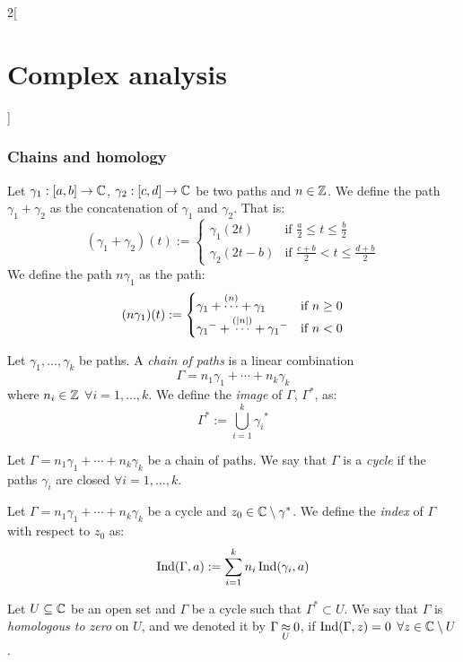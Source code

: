\documentclass[../../../main_math.tex]{subfiles}
\begin{document}
\begin{multicols}{2}[\section{Complex analysis}]
  \subsubsection{Chains and homology}
  \begin{definition}
    Let $\gamma_1:[a,b]\rightarrow\mathbb{C}$, $\gamma_2:[c,d]\rightarrow\mathbb{C}$ be two paths and $n\in\mathbb{Z}$. We define the path $\gamma_1+\gamma_2$ as the concatenation of $\gamma_1$ and $\gamma_2$. That is:
    $$
      (\gamma_1+\gamma_2)(t):=
      \begin{cases}
        \gamma_1(2t)   & \text{if }\frac{a}{2}\leq t\leq \frac{b}{2}  \\
        \gamma_2(2t-b) & \text{if }\frac{c+b}{2} <t\leq \frac{d+b}{2}
      \end{cases}
    $$
    We define the path $n\gamma_1$ as the path:
    $$
      (n\gamma_1)(t):=
      \begin{cases}
        \gamma_1+\overset{(n)}{\cdots}+\gamma_1               & \text{if }n\geq 0 \\
        {\gamma_1}^-+\overset{(\abs{n})}{\cdots}+{\gamma_1}^- & \text{if }n<0
      \end{cases}
    $$
  \end{definition}
  \begin{definition}
    Let $\gamma_1,\ldots,\gamma_k$ be paths. A \emph{chain of paths} is a linear combination $$\Gamma=n_1\gamma_1+\cdots+n_k\gamma_k$$ where $n_i\in\mathbb{Z}$ $\forall i=1,\ldots,k$. We define the \emph{image} of $\Gamma$, $\Gamma^*$, as:
    $$\Gamma^*:=\bigcup_{i=1}^k{\gamma_i}^*$$
  \end{definition}
  \begin{definition}
    Let $\Gamma=n_1\gamma_1+\cdots+n_k\gamma_k$ be a chain of paths. We say that $\Gamma$ is a \emph{cycle} if the paths $\gamma_i$ are closed $\forall i=1,\ldots,k$.
  \end{definition}
  \begin{definition}
    Let $\Gamma=n_1\gamma_1+\cdots+n_k\gamma_k$ be a cycle and $z_0\in\mathbb{C}\setminus\gamma^*$. We define the \emph{index} of $\Gamma$ with respect to $z_0$ as: $$\operatorname{Ind}(\Gamma,a):=\sum_{i=1}^kn_i\operatorname{Ind}(\gamma_i,a)$$
  \end{definition}
  \begin{definition}
    Let $U\subseteq \mathbb{C}$ be an open set and $\Gamma$ be a cycle such that $\Gamma^*\subset U$. We say that $\Gamma$ is \emph{homologous to zero} on $U$, and we denoted it by $\Gamma\mathbin{\underset{U}{\approx}} 0$, if $\operatorname{Ind}(\Gamma,z)=0$ $\forall z\in\mathbb{C}\setminus U$.
  \end{definition}

\end{multicols}
\end{document}
